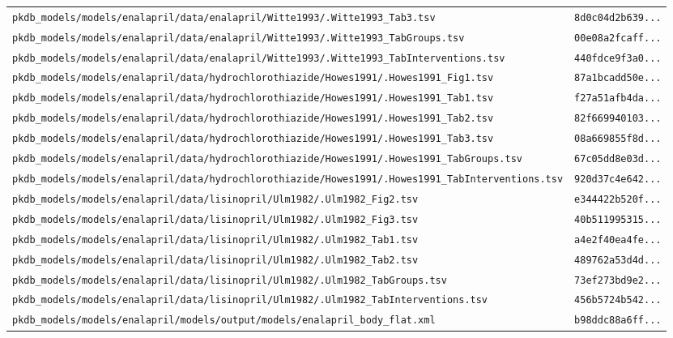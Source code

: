 \begin{longtable}{ll}
\texttt{pkdb\_models/models/enalapril/data/enalapril/Witte1993/.Witte1993\_Tab3.tsv} & \texttt{8d0c04d2b639...} \\
\texttt{pkdb\_models/models/enalapril/data/enalapril/Witte1993/.Witte1993\_TabGroups.tsv} & \texttt{00e08a2fcaff...} \\
\texttt{pkdb\_models/models/enalapril/data/enalapril/Witte1993/.Witte1993\_TabInterventions.tsv} & \texttt{440fdce9f3a0...} \\
\texttt{pkdb\_models/models/enalapril/data/hydrochlorothiazide/Howes1991/.Howes1991\_Fig1.tsv} & \texttt{87a1bcadd50e...} \\
\texttt{pkdb\_models/models/enalapril/data/hydrochlorothiazide/Howes1991/.Howes1991\_Tab1.tsv} & \texttt{f27a51afb4da...} \\
\texttt{pkdb\_models/models/enalapril/data/hydrochlorothiazide/Howes1991/.Howes1991\_Tab2.tsv} & \texttt{82f669940103...} \\
\texttt{pkdb\_models/models/enalapril/data/hydrochlorothiazide/Howes1991/.Howes1991\_Tab3.tsv} & \texttt{08a669855f8d...} \\
\texttt{pkdb\_models/models/enalapril/data/hydrochlorothiazide/Howes1991/.Howes1991\_TabGroups.tsv} & \texttt{67c05dd8e03d...} \\
\texttt{pkdb\_models/models/enalapril/data/hydrochlorothiazide/Howes1991/.Howes1991\_TabInterventions.tsv} & \texttt{920d37c4e642...} \\
\texttt{pkdb\_models/models/enalapril/data/lisinopril/Ulm1982/.Ulm1982\_Fig2.tsv} & \texttt{e344422b520f...} \\
\texttt{pkdb\_models/models/enalapril/data/lisinopril/Ulm1982/.Ulm1982\_Fig3.tsv} & \texttt{40b511995315...} \\
\texttt{pkdb\_models/models/enalapril/data/lisinopril/Ulm1982/.Ulm1982\_Tab1.tsv} & \texttt{a4e2f40ea4fe...} \\
\texttt{pkdb\_models/models/enalapril/data/lisinopril/Ulm1982/.Ulm1982\_Tab2.tsv} & \texttt{489762a53d4d...} \\
\texttt{pkdb\_models/models/enalapril/data/lisinopril/Ulm1982/.Ulm1982\_TabGroups.tsv} & \texttt{73ef273bd9e2...} \\
\texttt{pkdb\_models/models/enalapril/data/lisinopril/Ulm1982/.Ulm1982\_TabInterventions.tsv} & \texttt{456b5724b542...} \\
\texttt{pkdb\_models/models/enalapril/models/output/models/enalapril\_body\_flat.xml} & \texttt{b98ddc88a6ff...} \\
\end{longtable}

